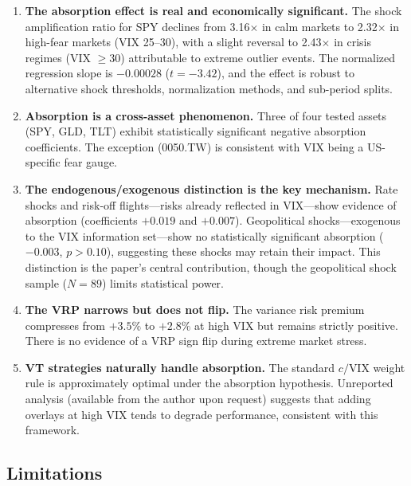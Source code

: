 \documentclass[12pt,a4paper]{article}
\begin{document}
\begin{enumerate}
    \item \textbf{The absorption effect is real and economically significant.} The shock amplification ratio for SPY declines from 3.16$\times$ in calm markets to 2.32$\times$ in high-fear markets (VIX 25--30), with a slight reversal to 2.43$\times$ in crisis regimes (VIX $\geq 30$) attributable to extreme outlier events. The normalized regression slope is $-0.00028$ ($t = -3.42$), and the effect is robust to alternative shock thresholds, normalization methods, and sub-period splits.

    \item \textbf{Absorption is a cross-asset phenomenon.} Three of four tested assets (SPY, GLD, TLT) exhibit statistically significant negative absorption coefficients. The exception (0050.TW) is consistent with VIX being a US-specific fear gauge.

    \item \textbf{The endogenous/exogenous distinction is the key mechanism.} Rate shocks and risk-off flights---risks already reflected in VIX---show evidence of absorption (coefficients $+0.019$ and $+0.007$). Geopolitical shocks---exogenous to the VIX information set---show no statistically significant absorption ($-0.003$, $p > 0.10$), suggesting these shocks may retain their impact. This distinction is the paper's central contribution, though the geopolitical shock sample ($N = 89$) limits statistical power.

    \item \textbf{The VRP narrows but does not flip.} The variance risk premium compresses from $+3.5\%$ to $+2.8\%$ at high VIX but remains strictly positive. There is no evidence of a VRP sign flip during extreme market stress.

    \item \textbf{VT strategies naturally handle absorption.} The standard $c/\text{VIX}$ weight rule is approximately optimal under the absorption hypothesis. Unreported analysis (available from the author upon request) suggests that adding overlays at high VIX tends to degrade performance, consistent with this framework.
\end{enumerate}

\subsection{Limitations}
\end{document}
